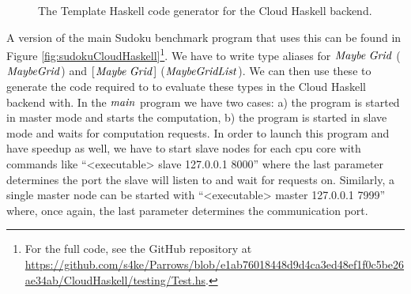 \documentclass[paper=A4,twoside=true,openright,parskip=full,chapterprefix=true,headings=normal,bibliography=totoc,listof=totoc,titlepage=on,captions=tableabove,draft=false,british]{scrreprt}%
\renewcommand{\enquote}[1]{{``}#1{''}}
\begin{document}
\begin{figure}
\resethooks
\caption{The Template Haskell code generator for the Cloud Haskell backend.}\label{fig:evalGen}\end{figure}

A version of the main Sudoku benchmark program that uses this can be
found in Figure \ref{fig:sudokuCloudHaskell}\footnote{For the full code,
  see the GitHub repository at
  \url{https://github.com/s4ke/Parrows/blob/e1ab76018448d9d4ca3ed48ef1f0c5be26ae34ab/CloudHaskell/testing/Test.hs}.}.
We have to write type aliases for \ensuremath{\Conid{Maybe}\;\Conid{Grid}} (\ensuremath{\Conid{MaybeGrid}}) and
\ensuremath{[\mskip1.5mu \Conid{Maybe}\;\Conid{Grid}\mskip1.5mu]} (\ensuremath{\Conid{MaybeGridList}}). We can then use these to generate the
code required to to evaluate these types in the Cloud Haskell backend
with. In the \ensuremath{\Varid{main}} program we have two cases: a) the program is started
in master mode and starts the computation, b) the program is started in
slave mode and waits for computation requests. In order to launch this
program and have speedup as well, we have to start slave nodes for each
cpu core with commands like \enquote{<executable> slave 127.0.0.1 8000}
where the last parameter determines the port the slave will listen to
and wait for requests on. Similarly, a single master node can be started
with \enquote{<executable> master 127.0.0.1 7999} where, once again, the
last parameter determines the communication port.

\vfill
\end{document}
